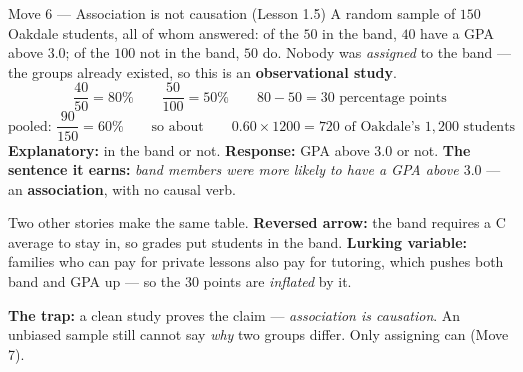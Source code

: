 \documentclass[10pt]{article}
\begin{document}
\vspace{3pt}
\boxguard[16]
\begin{notesbox}{Move 6 --- Association is not causation (Lesson 1.5)}
\small
A random sample of $150$ Oakdale students, all of whom answered: of the $50$ in the band, $40$
have a GPA above $3.0$; of the $100$ not in the band, $50$ do. Nobody was \emph{assigned} to
the band --- the groups already existed, so this is an \textbf{observational study}.
\[ \frac{40}{50} = 80\% \qquad \frac{50}{100} = 50\% \qquad 80 - 50 = 30 \text{ percentage
   points} \]
\[ \text{pooled: } \frac{90}{150} = 60\% \qquad\text{so about}\qquad 0.60 \times 1200 = 720
   \text{ of Oakdale's } 1{,}200 \text{ students} \]
\textbf{Explanatory:} in the band or not. \quad \textbf{Response:} GPA above $3.0$ or not.
\quad \textbf{The sentence it earns:} \emph{band members were more likely to have a GPA above
$3.0$} --- an \textbf{association}, with no causal verb.

\vspace{2pt}
Two other stories make the same table. \textbf{Reversed arrow:} the band requires a C average
to stay in, so grades put students in the band. \textbf{Lurking variable:} families who can pay
for private lessons also pay for tutoring, which pushes both band and GPA up --- so the $30$
points are \emph{inflated} by it.

\vspace{2pt}
\textbf{The trap:} a clean study proves the claim --- \emph{association is causation}. An
unbiased sample still cannot say \emph{why} two groups differ. Only assigning can (Move 7).
\end{notesbox}
\end{document}
